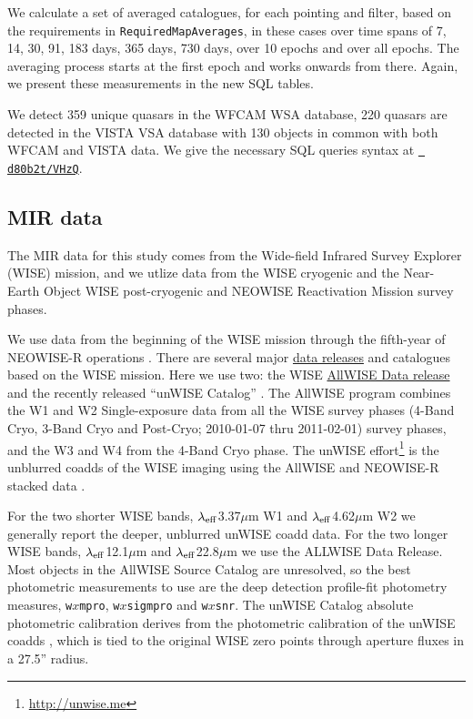 \documentclass[usenatbib]{mnras}
\begin{document}
  We calculate a set of averaged catalogues, for each pointing and filter, based
  on the requirements in \verb+RequiredMapAverages+, in these cases over time
  spans of 7, 14, 30, 91, 183 days, 365 days, 730 days, over 10 epochs and
  over all epochs. The averaging process starts at the first epoch and works onwards 
  from there. Again, we present these measurements in the new SQL tables. 

  We detect 359 unique quasars in the WFCAM WSA database, 220 quasars
  are detected in the VISTA VSA database with 130 objects in common with
  both WFCAM and VISTA data.  We give the necessary SQL queries syntax
  at \href{https://github.com/d80b2t/VHzQ/blob/master/data/WSA_VSA/SAMPLE_SQL_QUERIES}{\tt
    d80b2t/VHzQ}.
  

\subsection{MIR data}
The MIR data for this study comes from the Wide-field Infrared Survey Explorer (WISE) mission, and we utlize data from the WISE cryogenic and the Near-Earth Object WISE \citep[NEOWISE; ][]{Mainzer2011} post-cryogenic and NEOWISE Reactivation Mission \citep[NEOWISE-R][]{Mainzer2014} survey phases.

We use data from the beginning of the WISE mission \citep[2010 January; ][]{Wright2010} through the fifth-year of NEOWISE-R operations \citep[2018 December;]{Mainzer2011}.  There are several  major \href{https://irsa.ipac.caltech.edu/Missions/wise.html}{data releases} and catalogues based on the WISE mission. Here we use two: the WISE \href{http://wise2.ipac.caltech.edu/docs/release/allwise/}{AllWISE Data release} and the recently released ``unWISE Catalog'' \citet{Schlafly2019}. The AllWISE program combines the W1 and W2 Single-exposure data from all the WISE survey phases (4-Band Cryo, 3-Band Cryo and Post-Cryo; 2010-01-07 thru 2011-02-01) survey phases, and the W3 and W4 from the 4-Band Cryo phase. The unWISE effort\footnote{\href{http://unwise.me}{http://unwise.me}} is the unblurred coadds of the WISE imaging using the AllWISE and NEOWISE-R stacked data \citep{Lang2014, Meisner2018a, Meisner2018b}.

For the two shorter WISE bands, $\lambda_{\rm eff}$3.37$\mu$m W1 and $\lambda_{\rm eff}$4.62$\mu$m W2 we generally report the deeper, unblurred unWISE coadd data.  For the two longer WISE bands, $\lambda_{\rm eff}$12.1$\mu$m and $\lambda_{\rm eff}$22.8$\mu$m we use the ALLWISE Data Release.  Most objects in the AllWISE Source Catalog are unresolved, so the best photometric measurements to use are the deep detection profile-fit photometry measures,  {\tt w$x$mpro},  {\tt w$x$sigmpro} and  {\tt w$x$snr}. The unWISE Catalog absolute photometric calibration derives from the photometric calibration of the unWISE coadds \citep{Meisner2017a}, which is tied to the original WISE zero points through aperture fluxes in a 27.5'' radius. 
\end{document}
